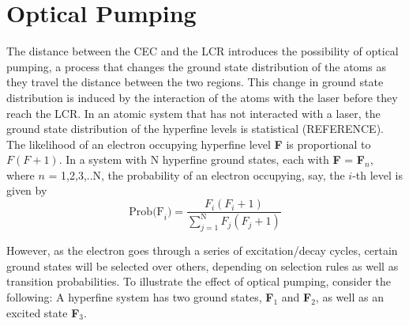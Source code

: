 \documentclass[12pt,a4paper,margin=1in]{report}
\begin{document}
\section{Optical Pumping}

The distance between the CEC and the LCR introduces the possibility of optical pumping, a process that changes the ground state distribution of the atoms as they travel the distance between the two regions. This change in ground state distribution is induced by the interaction of the atoms with the laser before they reach the LCR. In an atomic system that has not interacted with a laser, the ground state distribution of the hyperfine levels is statistical (REFERENCE). The likelihood of an electron occupying hyperfine level \textbf{F} is proportional to $F(F+1)$. In a system with N hyperfine ground states, each with \textbf{F} = \textbf{F}$_n$, where $n$ = 1,2,3,..N, the probability of an electron occupying, say, the $i$-th level is given by
\begin{equation}
\mathrm{Prob(F}_i) = \frac{F_i(F_i+1)}{\sum_{j=1}^\mathrm{N}F_j(F_j+1)}
\end{equation}

However, as the electron goes through a series of excitation/decay cycles, certain ground states will be selected over others, depending on selection rules as well as transition probabilities. To illustrate the effect of optical pumping, consider the following: A hyperfine system has two ground states, \textbf{F}$_1$ and \textbf{F}$_2$, as well as an excited state \textbf{F}$_3$.


{}
\end{document}
